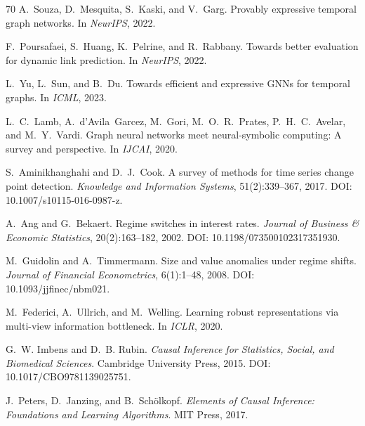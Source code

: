 \documentclass[11pt]{article}
\begin{document}
\begin{thebibliography}{70}
A.~Souza, D.~Mesquita, S.~Kaski, and V.~Garg.
\newblock Provably expressive temporal graph networks.
\newblock In \emph{NeurIPS}, 2022.

F.~Poursafaei, S.~Huang, K.~Pelrine, and R.~Rabbany.
\newblock Towards better evaluation for dynamic link prediction.
\newblock In \emph{NeurIPS}, 2022.

L.~Yu, L.~Sun, and B.~Du.
\newblock Towards efficient and expressive GNNs for temporal graphs.
\newblock In \emph{ICML}, 2023.

L.~C.~Lamb, A.~d'Avila~Garcez, M.~Gori, M.~O.~R.~Prates, P.~H.~C.~Avelar, and M.~Y.~Vardi.
\newblock Graph neural networks meet neural-symbolic computing: A survey and perspective.
\newblock In \emph{IJCAI}, 2020.

S.~Aminikhanghahi and D.~J.~Cook.
\newblock A survey of methods for time series change point detection.
\newblock \emph{Knowledge and Information Systems}, 51(2):339--367, 2017. DOI: 10.1007/s10115-016-0987-z.

A.~Ang and G.~Bekaert.
\newblock Regime switches in interest rates.
\newblock \emph{Journal of Business \& Economic Statistics}, 20(2):163--182, 2002. DOI: 10.1198/073500102317351930.

M.~Guidolin and A.~Timmermann.
\newblock Size and value anomalies under regime shifts.
\newblock \emph{Journal of Financial Econometrics}, 6(1):1--48, 2008. DOI: 10.1093/jjfinec/nbm021.

M.~Federici, A.~Ullrich, and M.~Welling.
\newblock Learning robust representations via multi-view information bottleneck.
\newblock In \emph{ICLR}, 2020.

G.~W. Imbens and D.~B. Rubin.
\newblock \emph{Causal Inference for Statistics, Social, and Biomedical Sciences}.
\newblock Cambridge University Press, 2015.
\newblock DOI: 10.1017/CBO9781139025751.

J.~Peters, D.~Janzing, and B.~Sch{\"o}lkopf.
\newblock \emph{Elements of Causal Inference: Foundations and Learning Algorithms}.
\newblock MIT Press, 2017.


\end{thebibliography}
\end{document}
